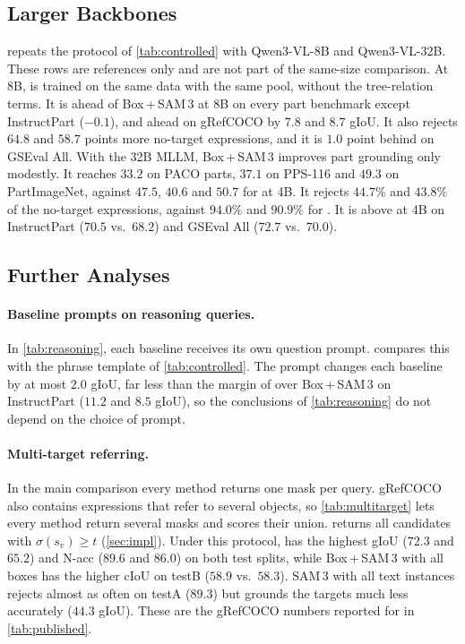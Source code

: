 \subsection{Larger Backbones}
\label{sec:supp_backbones}
 repeats the protocol of \cref{tab:controlled} with Qwen3-VL-8B and Qwen3-VL-32B. These rows are
references only and are not part of the same-size comparison. At 8B, \ours{} is trained on the same data with the
same pool, without the tree-relation terms. It is ahead of Box\,+\,SAM\,3 at 8B on every part benchmark except
InstructPart ($-0.1$), and ahead on gRefCOCO by $7.8$ and $8.7$ gIoU. It also rejects $64.8$ and $58.7$ points more
no-target expressions, and it is $1.0$ point behind on GSEval All. With the 32B MLLM, Box\,+\,SAM\,3 improves part
grounding only modestly. It reaches $33.2$ on PACO parts, $37.1$ on PPS-116 and $49.3$ on PartImageNet, against
$47.5$, $40.6$ and $50.7$ for \ours{} at 4B. It rejects $44.7\%$ and $43.8\%$ of the no-target expressions, against
$94.0\%$ and $90.9\%$ for \ours{}. It is above \ours{} at 4B on InstructPart ($70.5$ vs.\ $68.2$) and GSEval All
($72.7$ vs.\ $70.0$).



\subsection{Further Analyses}
\label{sec:supp_further}

\paragraph{Baseline prompts on reasoning queries.}
In \cref{tab:reasoning}, each baseline receives its own question prompt.  compares this
with the phrase template of \cref{tab:controlled}. The prompt changes each baseline by at most $2.0$ gIoU, far less
than the margin of \ours{} over Box\,+\,SAM\,3 on InstructPart ($11.2$ and $8.5$ gIoU), so the conclusions of
\cref{tab:reasoning} do not depend on the choice of prompt.



\paragraph{Multi-target referring.}
In the main comparison every method returns one mask per query. gRefCOCO also contains expressions that refer to
several objects, so \cref{tab:multitarget} lets every method return several masks and scores their union. \ours{}
returns all candidates with $\sigma(s_v)\geq t$ (\cref{sec:impl}). Under this protocol, \ours{} has the highest gIoU
($72.3$ and $65.2$) and N-acc ($89.6$ and $86.0$) on both test splits, while Box\,+\,SAM\,3 with all boxes has the
higher cIoU on testB ($58.9$ vs.\ $58.3$). SAM\,3 with all text instances rejects almost as often on testA ($89.3$)
but grounds the targets much less accurately ($44.3$ gIoU). These are the gRefCOCO numbers reported for \ours{} in
\cref{tab:published}.

